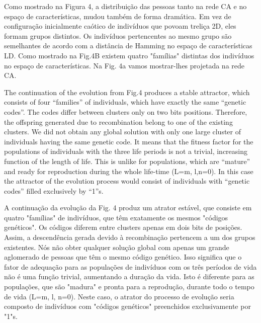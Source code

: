 \documentclass{article}
\begin{document}
Como mostrado na Figura 4, a distribuição das pessoas tanto na rede CA e no espaço de características, mudou também de forma dramática. Em vez de configuração inicialmente caótico de indivíduos que povoam treliça 2D, eles formam grupos distintos. Os indivíduos pertencentes ao mesmo grupo são semelhantes de acordo com a distância de Hamming no espaço de características LD. Como mostrado na Fig.4B existem quatro "famílias" distintas dos indivíduos no espaço de características. Na Fig. 4a vamos mostrar-lhes projetada na rede CA.

The continuation of the evolution from Fig.4 produces a stable attractor, which consists of four “families” of individuals, which have exactly the same “genetic codes”. The codes differ between clusters only on two bits positions. Therefore, the offspring generated due to recombination belong to one of the existing clusters. We did not obtain any global solution with only one large cluster of individuals having the same genetic code. It means that the fitness factor for the populations of individuals with the three life periods is not a trivial, increasing function of the length of life. This is unlike for populations, which are “mature” and ready for reproduction during the whole life-time (L=m, l,n=0). In this case the attractor of the evolution process would consist of individuals with “genetic codes” filled exclusively by “1”s.

A continuação da evolução da Fig. 4 produz um atrator estável, que consiste em quatro "famílias" de indivíduos, que têm exatamente os mesmos "códigos genéticos". Os códigos diferem entre clusters apenas em dois bits de posições. Assim, a descendência gerada devido à recombinação pertencem a um dos grupos existentes. Nós não obter qualquer solução global com apenas um grande aglomerado de pessoas que têm o mesmo código genético. Isso significa que o fator de adequação para as populações de indivíduos com os três períodos de vida não é uma função trivial, aumentando a duração da vida. Isto é diferente para as populações, que são "madura" e pronta para a reprodução, durante todo o tempo de vida (L=m, l, n=0). Neste caso, o atrator do processo de evolução seria composto de indivíduos com "códigos genéticos" preenchidos exclusivamente por "1"s.

\end{document}
